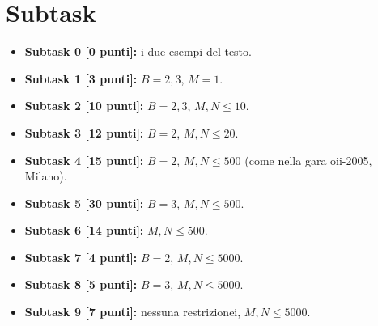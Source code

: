   \section*{Subtask}
  \begin{itemize}
    \item \textbf{Subtask 0 [0 punti]:} i due esempi del testo.
    \item \textbf{Subtask 1 [3 punti]:} $B=2,3$, $M = 1$.
    \item \textbf{Subtask 2 [10 punti]:} $B=2,3$, $M,N \leq 10$.
    \item \textbf{Subtask 3 [12 punti]:} $B=2$, $M,N \leq 20$.
    \item \textbf{Subtask 4 [15 punti]:} $B=2$, $M,N \leq 500$ (come nella gara oii-2005, Milano).
    \item \textbf{Subtask 5 [30 punti]:} $B=3$, $M,N \leq 500$.
    \item \textbf{Subtask 6 [14 punti]:} $M,N \leq 500$.
    \item \textbf{Subtask 7 [4 punti]:} $B=2$, $M,N \leq 5000$.
    \item \textbf{Subtask 8 [5 punti]:} $B=3$, $M,N \leq 5000$.
    \item \textbf{Subtask 9 [7 punti]:} nessuna restrizionei, $M,N \leq 5000$.
  \end{itemize}
  



